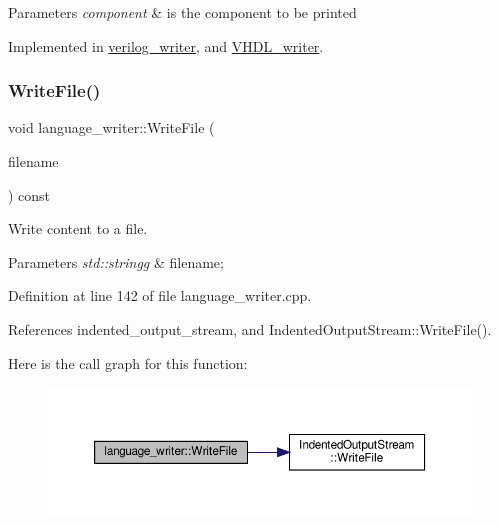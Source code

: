 \begin{DoxyParams}{Parameters}
{\em component} & is the component to be printed \\
\hline
\end{DoxyParams}


Implemented in \hyperlink{classverilog__writer_ae6de8e08344d96fdc22cfef1974b59fa}{verilog\+\_\+writer}, and \hyperlink{structVHDL__writer_a1058749b23119ee23449b16921619e04}{V\+H\+D\+L\+\_\+writer}.

\mbox{\label{classlanguage__writer_a2450f989cdb4b70610d544931d0add9e}} 
\subsubsection{\texorpdfstring{Write\+File()}{WriteFile()}}
{\footnotesize\ttfamily void language\+\_\+writer\+::\+Write\+File (\begin{DoxyParamCaption}\item[{const std\+::string \&}]{filename }\end{DoxyParamCaption}) const}



Write content to a file. 


\begin{DoxyParams}{Parameters}
{\em std\+::stringg} & filename; \\
\hline
\end{DoxyParams}


Definition at line 142 of file language\+\_\+writer.\+cpp.



References indented\+\_\+output\+\_\+stream, and Indented\+Output\+Stream\+::\+Write\+File().

Here is the call graph for this function\+:
\nopagebreak
\begin{figure}[H]
\begin{center}
\leavevmode
\includegraphics[width=350pt]{d6/d67/classlanguage__writer_a2450f989cdb4b70610d544931d0add9e_cgraph}
\end{center}
\end{figure}
\mbox{\label{classlanguage__writer_a8fa5e9dadb7566ee668c16555a13157a}} 
